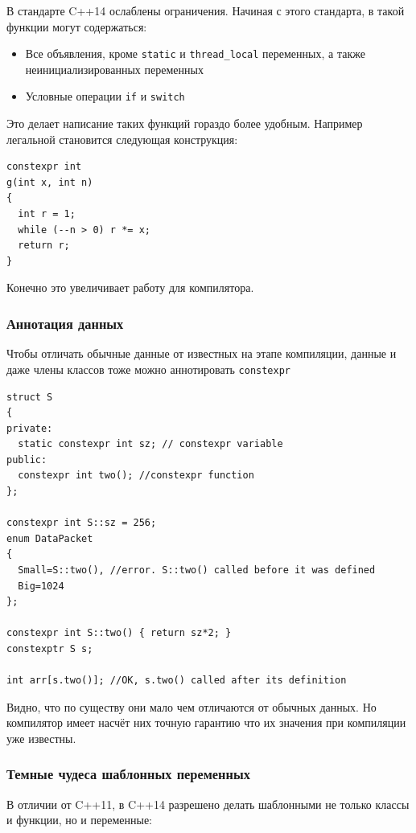 \documentclass[a4paper,12pt,oneside]{article}
\begin{document}
В стандарте C++14 ослаблены ограничения. Начиная с этого стандарта, в такой функции могут содержаться:

\begin{itemize}
\item Все объявления, кроме \lstinline!static! и \lstinline!thread_local! переменных, а также неинициализированных переменных
\item Условные операции \lstinline!if! и \lstinline!switch!
\end{itemize}

Это делает написание таких функций гораздо более удобным. Например легальной становится следующая конструкция:

\begin{lstlisting}
constexpr int 
g(int x, int n) 
{ 
  int r = 1;
  while (--n > 0) r *= x;
  return r;
}
\end{lstlisting}

Конечно это увеличивает работу для компилятора.

\subsubsection{Аннотация данных}

Чтобы отличать обычные данные от известных на этапе компиляции, данные и даже члены классов тоже можно аннотировать \lstinline!constexpr!

\begin{lstlisting}
struct S
{
private:
  static constexpr int sz; // constexpr variable
public:
  constexpr int two(); //constexpr function
};

constexpr int S::sz = 256;
enum DataPacket
{
  Small=S::two(), //error. S::two() called before it was defined
  Big=1024
};

constexpr int S::two() { return sz*2; }
constexptr S s;

int arr[s.two()]; //OK, s.two() called after its definition
\end{lstlisting}

Видно, что по существу они мало чем отличаются от обычных данных. Но компилятор имеет насчёт них точную гарантию что их значения при компиляции уже известны.

\subsubsection{Темные чудеса шаблонных переменных}

В отличии от C++11, в C++14 разрешено делать шаблонными не только классы и функции, но и переменные:
\end{document}

